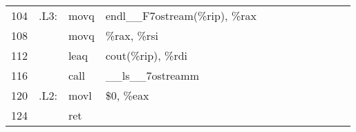 \documentclass{ti2}
\begin{document}
\begin{minipage}{\linewidth}
{\begin{tabular}{|r|rll||r|rll||r|rll|}
		104 &  .L3: & movq  & endl\_\_F7ostream(\%rip), \%rax &    &            &       &                   &    &             &       &  \\
		108 &       & movq  & \%rax, \%rsi                    &    &            &       &                   &    &             &       &  \\
		112 &       & leaq  & cout(\%rip), \%rdi              &    &            &       &                   &    &             &       &  \\
		116 &       & call  & \_\_ls\_\_7ostreamm             &    &            &       &                   &    &             &       &  \\
		120 &  .L2: & movl  & \$0, \%eax                      &    &            &       &                   &    &             &       &  \\
		124 &       & ret   &                                 &    &            &       &                   &    &             &       &
	\end{tabular}
	
	
	}
\end{minipage}
\end{document}
